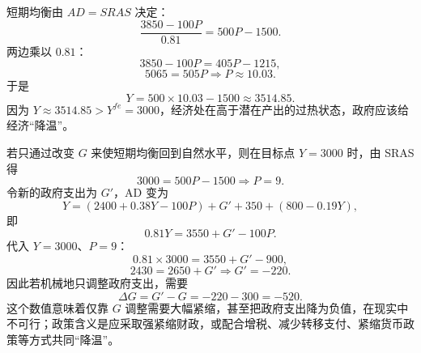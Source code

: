 \begin{question}
\begin{solution}
短期均衡由 $AD=SRAS$ 决定：
\[
\frac{3850-100P}{0.81}=500P-1500.
\]
两边乘以 $0.81$：
\[
3850-100P=405P-1215,
\]
\[
5065=505P\Rightarrow P\approx 10.03.
\]
于是
\[
Y=500\times 10.03-1500\approx 3514.85.
\]
因为 $Y\approx 3514.85>Y^{fe}=3000$，经济处在高于潜在产出的过热状态，政府应该给经济“降温”。

若只通过改变 $G$ 来使短期均衡回到自然水平，则在目标点 $Y=3000$ 时，由 SRAS 得
\[
3000=500P-1500\Rightarrow P=9.
\]
令新的政府支出为 $G'$，AD 变为
\[
Y=(2400+0.38Y-100P)+G'+350+(800-0.19Y),
\]
即
\[
0.81Y=3550+G'-100P.
\]
代入 $Y=3000$、$P=9$：
\[
0.81\times 3000=3550+G'-900,
\]
\[
2430=2650+G'\Rightarrow G'=-220.
\]
因此若机械地只调整政府支出，需要
\[
\Delta G=G'-G=-220-300=-520.
\]
这个数值意味着仅靠 $G$ 调整需要大幅紧缩，甚至把政府支出降为负值，在现实中不可行；政策含义是应采取强紧缩财政，或配合增税、减少转移支付、紧缩货币政策等方式共同“降温”。
\end{solution}
\end{question}

